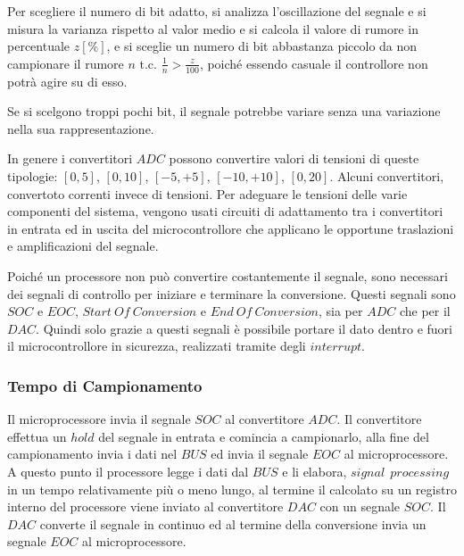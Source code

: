 \documentclass{article}
\numberwithin{equation}{subsection}
\begin{document}
Per scegliere il numero di bit adatto, si analizza l'oscillazione del segnale e si misura la varianza rispetto al valor medio e si calcola il valore di rumore in percentuale 
$z[\%]$, e si sceglie un numero di bit abbastanza piccolo da non campionare il rumore $n\mbox{ t.c. }\displaystyle\frac{1}{n}>\frac{z}{100}$, poiché essendo casuale il 
controllore non potrà agire su di esso. 



Se si scelgono troppi pochi bit, il segnale potrebbe variare senza una variazione nella sua rappresentazione. 

In genere i convertitori $ADC$ possono convertire valori di tensioni di queste tipologie: $[0,5]$, $[0,10]$, $[-5,+5]$, $[-10,+10]$, $[0,20]$. Alcuni convertitori, convertoto 
correnti invece di tensioni. Per adeguare le tensioni delle varie componenti del sistema, vengono usati circuiti di adattamento tra i convertitori in entrata ed in uscita del 
microcontrollore che applicano le opportune traslazioni e amplificazioni del segnale. 



Poiché un processore non può convertire costantemente il segnale, sono necessari dei segnali di controllo per iniziare e terminare la conversione. Questi segnali sono $SOC$ e 
$EOC$, $Start\:Of\:Conversion$ e $End\:Of\:Conversion$, sia per $ADC$ che per il $DAC$. Quindi solo grazie a questi segnali è possibile portare il dato dentro e fuori il 
microcontrollore in sicurezza, realizzati tramite degli $interrupt$.  

\subsubsection{Tempo di Campionamento}  

Il microprocessore invia il segnale $SOC$ al convertitore $ADC$. Il convertitore effettua un $hold$ del segnale in entrata e comincia a campionarlo, alla fine del campionamento  
invia i dati nel $BUS$ ed invia il segnale $EOC$ al microprocessore. A questo punto il processore legge i dati dal $BUS$ e li elabora, $signal\:\:processing$ in un tempo 
relativamente più o meno lungo, al termine il calcolato su un registro interno del processore viene inviato al convertitore $DAC$ con un segnale $SOC$. Il $DAC$ converte il 
segnale in continuo ed al termine della conversione invia un segnale $EOC$ al microprocessore. 
\end{document}
